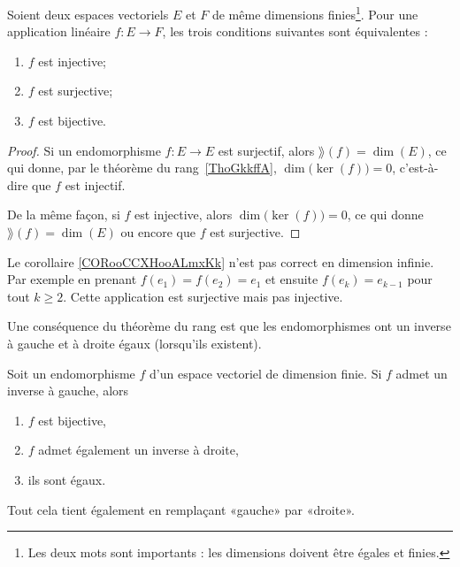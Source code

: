 \begin{corollary}       \label{CORooCCXHooALmxKk}
    Soient deux espaces vectoriels \( E\) et \( F\) de même dimensions finies\footnote{Les deux mots sont importants : les dimensions doivent être égales et finies.}. Pour une application linéaire \( f\colon E\to F\), les trois conditions suivantes sont équivalentes :
    \begin{enumerate}
        \item
            \( f\) est injective;
        \item
            \( f\) est surjective;
        \item
            \( f\) est bijective.
    \end{enumerate}
\end{corollary}

\begin{proof}
    Si un endomorphisme \( f\colon E\to E\) est surjectif, alors \( \rang(f)=\dim(E)\), ce qui donne, par le théorème du rang~\ref{ThoGkkffA}, \( \dim\big( \ker(f) \big)=0\), c'est-à-dire que \( f\) est injectif.

    De la même façon, si \( f\) est injective, alors \( \dim\big( \ker(f) \big)=0\), ce qui donne \( \rang(f)=\dim(E)\) ou encore que \( f\) est surjective.
\end{proof}

\begin{example}
    Le corollaire \ref{CORooCCXHooALmxKk} n'est pas correct en dimension infinie. Par exemple en prenant \( f(e_1)=f(e_2)=e_1\) et ensuite \( f(e_k)=e_{k-1}\) pour tout \( k\geq 2\). Cette application est surjective mais pas injective.
\end{example}

Une conséquence du théorème du rang est que les endomorphismes ont un inverse à gauche et à droite égaux (lorsqu'ils existent).
\begin{corollary}
    Soit un endomorphisme \( f\) d'un espace vectoriel de dimension finie. Si \( f\) admet un inverse à gauche, alors
    \begin{enumerate}
        \item
            \( f\) est bijective,
        \item
            \( f\) admet également un inverse à droite,
        \item
            ils sont égaux.
    \end{enumerate}
    Tout cela tient également en remplaçant «gauche» par «droite».
\end{corollary}

